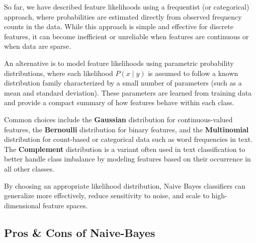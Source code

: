 \documentclass{article}
\begin{document}
So far, we have described feature likelihoods using a frequentist (or categorical) approach, where probabilities are estimated directly from observed frequency counts in the data. While this approach is simple and effective for discrete features, it can become inefficient or unreliable when features are continuous or when data are sparse.

An alternative is to model feature likelihoods using parametric probability distributions, where each likelihood $P(x\mid y)$ is assumed to follow a known distribution family characterized by a small number of parameters (such as a mean and standard deviation). These parameters are learned from training data and provide a compact summary of how features behave within each class.

Common choices include the \textbf{Gaussian} distribution for continuous-valued features, the \textbf{Bernoulli} distribution for binary features, and the \textbf{Multinomial} distribution for count-based or categorical data such as word frequencies in text. The \textbf{Complement} distribution is a variant often used in text classification to better handle class imbalance by modeling features based on their occurrence in all other classes.

By choosing an appropriate likelihood distribution, Naive Bayes classifiers can generalize more effectively, reduce sensitivity to noise, and scale to high-dimensional feature spaces.



\subsection{Pros \& Cons of Naive-Bayes}
\end{document}
